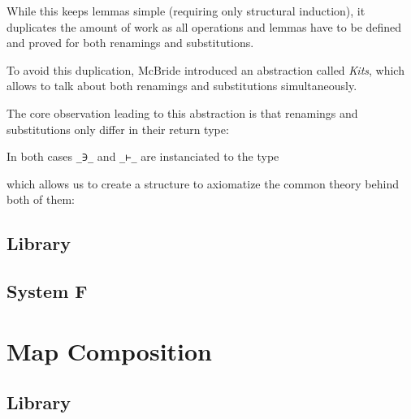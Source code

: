\documentclass[sigplan,10pt]{acmart}
\newenvironment{LibCode*}{%
  \begin{tcolorbox}[%
    colframe=white,%
    boxrule=0.0pt,%
    top=2.5pt,%
    left=2.5pt,%
    bottom=2.5pt,%
    right=2.5pt,%
    boxsep=0pt%
  ]\vspace{-0.2\baselineskip}%
}{%
  \vspace{-1\baselineskip}%
  \end{tcolorbox}%
}
\newenvironment{ExampleCode*}{%
  \begin{tcolorbox}[%
    colframe=white,%
    colback=yellow!5,%
    boxrule=0.0pt,%
    top=2.5pt,%
    left=2.5pt,%
    bottom=2.5pt,%
    right=2.5pt,%
    boxsep=0pt%
  ]\vspace{-0.2\baselineskip}%
}{%
  \vspace{-1\baselineskip}%
  \end{tcolorbox}%
}
\newcommand*\LibCode[1]{\begin{LibCode*}{#1}\end{LibCode*}}
\newcommand*\AppCode[1]{{#1}}
\newcommand*\ExampleCode[1]{\begin{ExampleCode*}{#1}\end{ExampleCode*}}
\begin{document}
  While this keeps lemmas simple (requiring only structural induction),
  it duplicates the amount of work as all operations and lemmas have
  to be defined and proved for both renamings and substitutions.

  To avoid this duplication,
  McBride\cite{DBLP:journals/jar/BentonHKM12, unpublished:mcbride2005kits}
  introduced an abstraction called \emph{Kits}, which allows to talk about
  both renamings and substitutions simultaneously.

  The core observation leading to this abstraction is that renamings
  and substitutions only differ in their return type:
  \ExampleCode\FExampleSubRen

  In both cases \texttt{\_∋\_} and \texttt{\_⊢\_} are instanciated to the type
  \LibCode\KScoped
  which allows us to create a structure to axiomatize the common
  theory behind both of them:
  \LibCode\KKit



  \subsection{Library}
  \LibCode\KAp
  \LibCode\KExt
  \LibCode\KLift
  \LibCode\KId
  \LibCode\KSingle
  \LibCode\KWeaken
  \LibCode\KEq
  \LibCode\KFunExt
  \LibCode\KIdLift
  \LibCode\KKitNotation
  \LibCode\KTraversal
  \LibCode\KKitInstances
  \LibCode\KKitOpen
  \subsection{System F}
  \AppCode\FTraversalOp
  \AppCode\FTraversalId
  \AppCode\FTraversalIdProofInteresting
  \AppCode\FTraversal

  \section{Map Composition}
  \subsection{Library}
  \LibCode\KWkKit
  \LibCode\KWkKitInstances
  \LibCode\KComposeKit
  \LibCode\KComposition
  \LibCode\KComposeKitAp
  \LibCode\KDistLiftCompose
  \LibCode\KComposeKitNotation
  \LibCode\KComposeTraversal
  \LibCode\KCommLiftWeaken
  \LibCode\KCommLiftWeakenTraverse
  \LibCode\KComposeKitInstances
  \LibCode\KComposeKitInstancesConcrete
  \LibCode\KWeakenCancelsSingle
  \LibCode\KWeakenCancelsSingleTraverse
  \LibCode\KDistLiftSingle
  \LibCode\KDistLiftSingleTraverse
\end{document}
